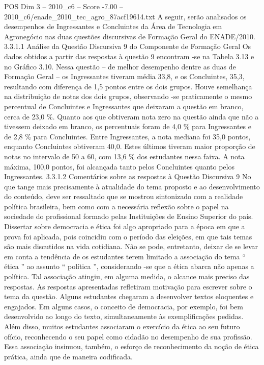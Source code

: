 \begin{textsample}{POS Dim 3 – 2010\_c6 – Score -7.00 – 2010\_c6/enade\_2010\_tec\_agro\_87acf19614.txt}
A seguir, serão analisados os desempenhos de Ingressantes e Concluintes da Área de Tecnologia em Agronegócio nas duas questões discursivas de Formação Geral do ENADE/2010. 3.3.1.1 Análise da Questão Discursiva 9 do Componente de Formação Geral Os dados obtidos a partir das respostas à questão 9 encontram -se na Tabela 3.13 e no Gráfico 3.10.
Nessa questão – de melhor desempenho dentre as duas de Formação Geral – os Ingressantes tiveram média 33,8, e os Concluintes, 35,3, resultando com diferença de 1,5 pontos entre os dois grupos.
Houve semelhança na distribuição de notas dos dois grupos, observando -se praticamente o mesmo percentual de Concluintes e Ingressantes que deixaram a questão em branco, cerca de 23,0 \%.
Quanto aos que obtiveram nota zero na questão ainda que não a tivessem deixado em branco, os percentuais foram de 4,0 \% para Ingressantes e de 2,8 \% para Concluintes.
Entre Ingressantes, a nota mediana foi 35,0 pontos, enquanto Concluintes obtiveram 40,0.
Estes últimos tiveram maior proporção de notas no intervalo de 50 a 60, com 13,6 \% dos estudantes nessa faixa.
A nota máxima, 100,0 pontos, foi alcançada tanto pelos Concluintes quanto pelos Ingressantes. 3.3.1.2 Comentários sobre as respostas à Questão Discursiva 9 No que tange mais precisamente à atualidade do tema proposto e ao desenvolvimento do conteúdo, deve ser ressaltado que se mostrou sintonizado com a realidade política brasileira, bem como com a necessária reflexão sobre o papel na sociedade do profissional formado pelas Instituições de Ensino Superior do país.
Dissertar sobre democracia e ética foi algo apropriado para a época em que a prova foi aplicada, pois coincidiu com o período das eleições, em que tais temas são mais discutidos na vida cotidiana.
Não se pode, entretanto, deixar de se levar em conta a tendência de os estudantes terem limitado a associação do tema “ ética ” ao assunto “ política ”, considerando -se que a ética abarca não apenas a política.
Tal associação atingiu, em alguma medida, o alcance mais preciso das respostas.
As respostas apresentadas refletiram motivação para escrever sobre o tema da questão.
Alguns estudantes chegaram a desenvolver textos eloquentes e engajados.
Em alguns casos, o conceito de democracia, por exemplo, foi bem desenvolvido ao longo do texto, simultaneamente às exemplificações pedidas.
Além disso, muitos estudantes associaram o exercício da ética ao seu futuro ofício, reconhecendo o seu papel como cidadão no desempenho de sua profissão.
Essa associação insinuou, também, o esforço de reconhecimento da noção de ética prática, ainda que de maneira codificada.

\end{textsample}

